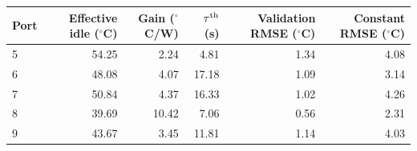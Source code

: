 \begin{tabular}{@{}lrrrrr@{}}
\toprule
Port & Effective idle ($^\circ$C) & Gain ($^\circ$C/W) & $\tau^{\rm th}$ (s) & Validation RMSE ($^\circ$C) & Constant RMSE ($^\circ$C)\\
\midrule
5 & 54.25 & 2.24 & 4.81 & 1.34 & 4.08\\
6 & 48.08 & 4.07 & 17.18 & 1.09 & 3.14\\
7 & 50.84 & 4.37 & 16.33 & 1.02 & 4.26\\
8 & 39.69 & 10.42 & 7.06 & 0.56 & 2.31\\
9 & 43.67 & 3.45 & 11.81 & 1.14 & 4.03\\
\bottomrule
\end{tabular}
